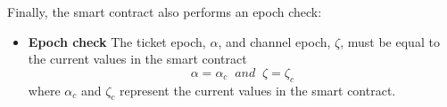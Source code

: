 Finally, the smart contract also performs an epoch check:
\begin{itemize}
      \item
            \textbf{Epoch check} The ticket epoch, $\alpha$, and channel epoch, $\zeta$, must be equal to the current values in the smart contract $$\alpha=\alpha_c \;\; and \;\; \zeta=\zeta_c$$ where $\alpha_c$ and $\zeta_c$ represent the current values in the smart contract.
\end{itemize}
